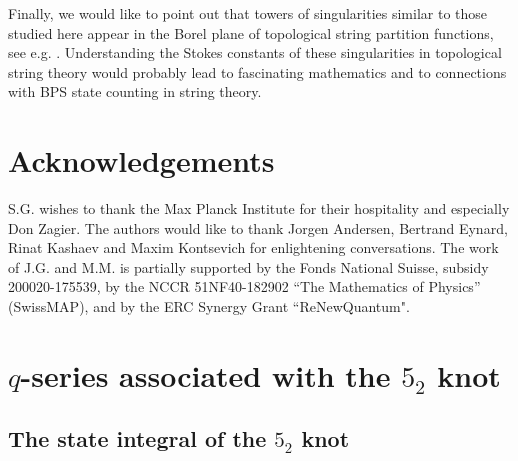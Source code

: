 \documentclass[12pt,reqno]{amsart}
\theoremstyle{definition}
\begin{document}
Finally, we would like to point out that towers of singularities
similar to those studied here appear in the Borel plane of topological
string partition functions, see
e.g. \cite{pas-schiappa,cms}. Understanding the Stokes constants of
these singularities in topological string theory would probably lead
to fascinating mathematics and to connections with BPS state counting
in string theory.


\section*{Acknowledgements}

S.G. wishes to thank the Max Planck Institute for their hospitality
and especially Don Zagier. The authors would like to thank Jorgen Andersen,
Bertrand Eynard, Rinat Kashaev and Maxim Kontsevich for enlightening
conversations. The work of J.G. and M.M. is partially supported by the
Fonds National Suisse, subsidy 200020-175539, by the NCCR
51NF40-182902 ``The Mathematics of Physics'' (SwissMAP), and by the
ERC Synergy Grant ``ReNewQuantum".


\appendix

\section{$q$-series associated with the $5_2$ knot}
\label{sec.A52}

\subsection{The state integral of the $5_2$ knot}
\label{sub.52s}
  
\end{document}
